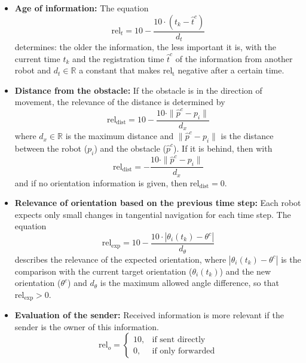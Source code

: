 \documentclass[conference]{IEEEtran}
\begin{document}
\begin{itemize}
    \item \textbf{Age of information:}
    The equation
    \begin{equation}
        \mathrm{rel}_t = 10 - \frac{10 \cdot (t_k - \hat{t}^c)}{d_t}
        \label{eq:5}
    \end{equation}
    determines: the older the information, the less important it is, with 
    the current time \( t_k \) and the registration time \( \hat{t}^c \) of the information from another 
    robot and \( d_t \in \mathbb{R} \) a constant that makes \( \mathrm{rel_t} \) negative after a
    certain time.
    
    \item \textbf{Distance from the obstacle:}
    If the obstacle is in the direction of movement, 
    the relevance of the distance is determined by 
    \begin{equation}
        \mathrm{rel}_{\mathrm{dist}} = 10 - \frac{10 \cdot \| \hat{p}^c - p_i \|}{d_x}
        \label{eq:6}
    \end{equation}
    where \( d_x \in \mathbb{R} \) is the maximum distance and \( \| \hat{p}^c - p_i \| \) is the distance between the robot ($p_i$) 
    and the obstacle ($\hat{p}^c$). If it is behind, then with
    \begin{equation}
        \mathrm{rel}_{\mathrm{dist}} = - \frac{10 \cdot \| \hat{p}^c - p_i \|}{d_x}
        \label{eq:7}
    \end{equation}
    and if no orientation information is given, then 
    \( \mathrm{rel}_{\mathrm{dist}} = 0 \).
    
    \item \textbf{Relevance of orientation based on the previous time step:}
    Each robot expects only small changes in tangential 
    navigation for each time step. The equation 
    \begin{equation}
        \mathrm{rel}_{\mathrm{exp}} = 10 - \frac{10 \cdot | \theta_i(t_k) - \theta^c |}{d_\theta}
        \label{eq:8}
    \end{equation}
    describes the relevance of the expected orientation, where 
    \( |\theta_i(t_k) - \theta^c| \) is the comparison with the current target orientation ($\theta_i(t_k)$) and 
    the new orientation ($\theta^c$) and \( d_\theta \) is the maximum allowed angle difference, so that
    \( \mathrm{rel}_{\mathrm{exp}} > 0 \).
    
    \item \textbf{Evaluation of the sender:}
    Received information is more relevant if the sender is the owner of this information.
    \begin{equation}
        \mathrm{rel}_o =
        \begin{cases}
        10, & \text{if sent directly}\\
        0, & \text{if only forwarded}
        \end{cases}
        \label{eq:9}
    \end{equation}
    

\end{itemize}
\end{document}
